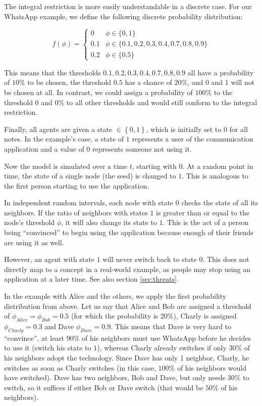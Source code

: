 \documentclass{sig-alternate-05-2015}
\begin{document}
The integral restriction is more easily understandable in a discrete case. For our WhatsApp example, we define the following discrete probability distribution:

$$
f(\phi) =
  \begin{cases}
    0 & \phi \in \{0, 1\} \\
    0.1 & \phi \in \{0.1, 0.2, 0.3, 0.4, 0.7, 0.8, 0.9\} \\
    0.2 & \phi \in \{0.5\}
  \end{cases}
$$

This means that the thresholds $0.1, 0.2, 0.3, 0.4, 0.7, 0.8, 0.9$ all have a probability of $10\%$ to be chosen, the threshold $0.5$ has a chance of $20\%$, and 0 and 1 will not be chosen at all. In contrast, we could assign a probability of $100\%$ to the threshold 0 and $0\%$ to all other thresholds and would still conform to the integral restriction.

Finally, all agents are given a state $\in \left\lbrace 0, 1 \right\rbrace$, which is initially set to $0$ for all notes. In the example's case, a state of $1$ represents a user of the communication application and a value of $0$ represents someone not using it.

Now the model is simulated over a time $t$, starting with $0$. At a random point in time, the state of a single node (the seed) is changed to $1$. This is analogous to the first person starting to use the application.

In independent random intervals, each node with state $0$ checks the state of all its neighbors. If the ratio of neighbors with states $1$ is greater than or equal to the node's threshold $\phi$, it will also change its state to $1$. This is the act of a person being ``convinced'' to begin using the application because enough of their friends are using it as well.

However, an agent with state $1$ will never switch back to state $0$. This does not directly map to a concept in a real-world example, as people may stop using an application at a later time. See also section \ref{sec:threats}.

In the example with Alice and the others, we apply the first probability distribution from above. Let us say that Alice and Bob are assigned a threshold of $\phi_{Alice} = \phi_{Bob} = 0.5$ (for which the probability is $20\%$), Charly is assigned $\phi_{Charly} = 0.3$ and Dave $\phi_{Dave} = 0.9$. This means that Dave is very hard to ``convince'', at least $90\%$ of his neighbors must use WhatsApp before he decides to use it (switch his state to $1$), whereas Charly already switches if only $30\%$ of his neighbors adopt the technology. Since Dave has only 1 neighbor, Charly, he switches as soon as Charly switches (in this case, $100\%$ of his neighbors would have switched). Dave has two neighbors, Bob and Dave, but only needs $30\%$ to switch, so it suffices if either Bob or Dave switch (that would be $50\%$ of his neighbors).
\end{document}
